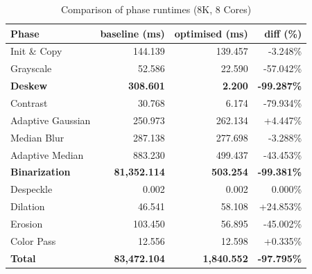 \documentclass[sigconf]{acmart}
\begin{document}
\begin{table}[htbp]
\caption{Comparison of phase runtimes (8K, 8 Cores)}
\label{tab:phase-runtime}
\small
\centering
\begin{tabular}{l rr r}
\toprule
\textbf{Phase} & \textbf{baseline (ms)} & \textbf{optimised (ms)} & \textbf{diff (\%)} \\
\midrule
Init \& Copy              & 144.139    & 139.457   & -3.248\% \\
Grayscale                 & 52.586     & 22.590    & -57.042\% \\
\textbf{Deskew}           & \textbf{308.601} & \textbf{2.200}   & \textbf{-99.287\%} \\
Contrast                  & 30.768     & 6.174     & -79.934\% \\
Adaptive Gaussian         & 250.973    & 262.134   & +4.447\% \\
Median Blur               & 287.138    & 277.698   & -3.288\% \\
Adaptive Median           & 883.230    & 499.437   & -43.453\% \\
\textbf{Binarization} & \textbf{81,352.114} & \textbf{503.254} & \textbf{-99.381\%} \\
Despeckle                 & 0.002      & 0.002     & 0.000\% \\
Dilation                  & 46.541     & 58.108    & +24.853\% \\
Erosion                   & 103.450    & 56.895    & -45.002\% \\
Color Pass                & 12.556     & 12.598    & +0.335\% \\
\textbf{Total}            & \textbf{83,472.104} & \textbf{1,840.552} & \textbf{-97.795\%} \\
\bottomrule
\end{tabular}
\end{table}


\end{document}

